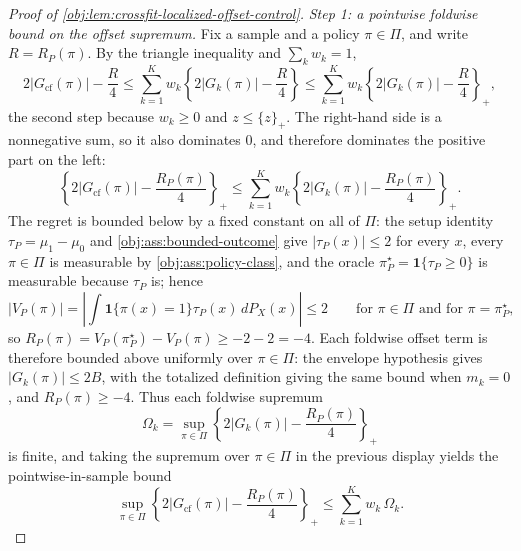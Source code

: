 \documentclass[11pt]{article}
\begin{document}
\begin{proof}[Proof of \cref{obj:lem:crossfit-localized-offset-control}]
\emph{Step 1: a pointwise foldwise bound on the offset supremum.}  Fix a sample and a policy \(\pi\in\Pi\), and write \(R=R_P(\pi)\).  By the triangle inequality and \(\sum_kw_k=1\),
\[
2\left|G_{\mathrm{cf}}(\pi)\right|-\frac R4
\le
\sum_{k=1}^K w_k\left\{2|G_k(\pi)|-\frac R4\right\}
\le
\sum_{k=1}^K w_k\left\{2|G_k(\pi)|-\frac R4\right\}_+ ,
\]
the second step because \(w_k\ge0\) and \(z\le\{z\}_+\).  The right-hand side is a nonnegative sum, so it also dominates \(0\), and therefore dominates the positive part on the left:
\[
\left\{2\left|G_{\mathrm{cf}}(\pi)\right|-\frac{R_P(\pi)}4\right\}_+
\le
\sum_{k=1}^K w_k\left\{2|G_k(\pi)|-\frac{R_P(\pi)}4\right\}_+ .
\]
The regret is bounded below by a fixed constant on all of \(\Pi\): the setup identity \(\tau_P=\mu_1-\mu_0\) and \cref{obj:ass:bounded-outcome} give \(|\tau_P(x)|\le2\) for every \(x\), every \(\pi\in\Pi\) is measurable by \cref{obj:ass:policy-class}, and the oracle \(\pi^\star_P=\mathbf 1\{\tau_P\ge0\}\) is measurable because \(\tau_P\) is; hence
\[
\left|V_P(\pi)\right|
=
\left|\int \mathbf 1\{\pi(x)=1\}\tau_P(x)\,dP_X(x)\right|
\le 2
\qquad\text{for }\pi\in\Pi\text{ and for }\pi=\pi^\star_P,
\]
so \(R_P(\pi)=V_P(\pi^\star_P)-V_P(\pi)\ge-2-2=-4\). %
Each foldwise offset term is therefore bounded above uniformly over \(\pi\in\Pi\): the envelope hypothesis gives \(|G_k(\pi)|\le2B\), with the totalized definition giving the same bound when \(m_k=0\), and \(R_P(\pi)\ge-4\). Thus each foldwise supremum
\[
\Omega_k=\sup_{\pi\in\Pi}\left\{2|G_k(\pi)|-\frac{R_P(\pi)}4\right\}_+
\]
is finite, and taking the supremum over \(\pi\in\Pi\) in the previous display yields the pointwise-in-sample bound
\[
\sup_{\pi\in\Pi}\left\{2\left|G_{\mathrm{cf}}(\pi)\right|-\frac{R_P(\pi)}4\right\}_+
\le
\sum_{k=1}^K w_k\,\Omega_k .
\]


\end{proof}
\end{document}
